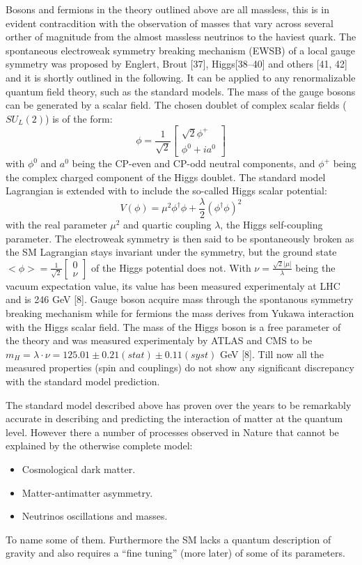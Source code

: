 Bosons and fermions in the theory outlined above are all massless, this is in evident contracdition with
the observation of masses that vary across several orther of magnitude from the almost massless neutrinos
to the haviest quark.
The spontaneous electroweak symmetry breaking mechanism (EWSB) of a local gauge
symmetry was proposed by Englert, Brout [37], Higgs[38–40] and others [41, 42] and it
is shortly outlined in the following. It can be applied to any renormalizable quantum field theory,
such as the standard models. The mass
of the gauge bosons can be generated by a scalar field. The chosen doublet of complex
scalar fields ($SU_L(2)$) is of the form:
\[
  \phi = \frac{1}{\sqrt{2}}\begin{bmatrix}
    \sqrt{2}\phi^+ \\
    \phi^0 + ia^0
  \end{bmatrix}
\]
with $\phi^0$ and $a^0$ being the CP-even and CP-odd neutral components, and $\phi^+$ being the
complex charged component of the Higgs doublet. The standard model Lagrangian is extended with
to include the so-called Higgs scalar potential:
\[
  V(\phi) = \mu^2\phi^{\dagger}\phi + \frac{\lambda}{2}(\phi^{\dagger}\phi)^2
\]
with the real parameter $\mu^2$ and quartic coupling $\lambda$, the Higgs self-coupling parameter.
The electroweak symmetry is then said to be spontaneously broken as the SM Lagrangian
stays invariant under the symmetry, but the ground state $<\phi> = \frac{1}{\sqrt{2}}\begin{bmatrix}0 \\ \nu \end{bmatrix}$
of the Higgs potential does not.
With $\nu = \frac{\sqrt{2}|\mu|}{\lambda}$ being the vacuum expectation value, its value has been
measured experimentaly at LHC and is 246 GeV [8].
Gauge boson acquire mass through the spontanous symmetry breaking mechanism while for fermions
the mass derives from Yukawa interaction with the Higgs scalar field.
The mass of the Higgs boson is a free parameter of the theory and was measured experimentaly by ATLAS and CMS to be
$m_H = \lambda\cdot\nu = 125.01\pm 0.21(stat) \pm 0.11 (syst)$ GeV [8].
Till now all the measured properties (spin and couplings) do not show any significant discrepancy with
the standard model prediction.

The standard model described above has proven over the years to be remarkably accurate in describing and
predicting the interaction of matter at the quantum level.
However there a number of processes observed in Nature that cannot be explained by the otherwise complete model:
\begin{itemize}
\item Cosmological dark matter.
\item Matter-antimatter asymmetry.
\item Neutrinos oscillations and masses.
\end{itemize}
To name some of them. Furthermore the SM lacks a quantum description of gravity and also requires
a ``fine tuning'' (more later) of some of its parameters.

